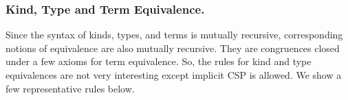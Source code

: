 \subsubsection{Kind, Type and Term Equivalence.}

Since the syntax of kinds, types, and terms is mutually recursive,
corresponding notions of equivalence are also mutually recursive.
They are congruences closed under a few axioms for term equivalence.
So, the rules for kind and type equivalences are not very interesting
except implicit CSP is allowed.
We show a few representative rules below.

  {\small
    \begin{center}
      \hfil
      \\[2mm]
    \end{center}
  }



